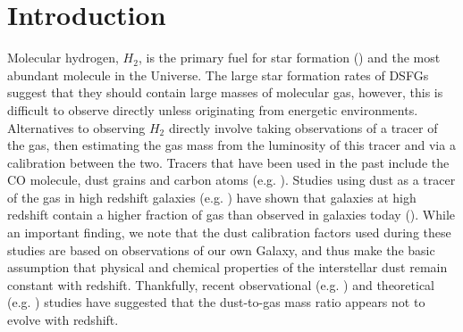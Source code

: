 \sloppy

\section{Introduction}

Molecular hydrogen, $H_2$, is the primary fuel for star formation (\citealt{Kennicutt_2012}) and the most abundant molecule in the Universe. The large star formation rates of DSFGs suggest that they should contain large masses of molecular gas, however, this is difficult to observe directly unless originating from energetic environments. Alternatives to observing $H_2$ directly involve taking observations of a tracer of the gas, then estimating the gas mass from the luminosity of this tracer and via a calibration between the two. Tracers that have been used in the past include the CO molecule, dust grains and carbon atoms (e.g. \citealt{Dunne_2022}). Studies using dust as a tracer of the gas in high redshift galaxies (e.g. \citealt{Magdis_2012, Eales_2012, Scoville_2014, Santini_2014, Genzel_2015}) have shown that galaxies at high redshift contain a higher fraction of gas than observed in galaxies today (\citealt{Tacconi_2010, Scoville_2016, Scoville_2017, Millard_2020}). While an important finding, we note that the dust calibration factors used during these studies are based on observations of our own Galaxy, and thus make the basic assumption that physical and chemical properties of the interstellar dust remain constant with redshift. Thankfully, recent observational (e.g. \citealt{Shapley_2020, Popping_2022}) and theoretical (e.g. \citealt{Popping_2017, Li_2019}) studies have suggested that the dust-to-gas mass ratio appears not to evolve with redshift.

